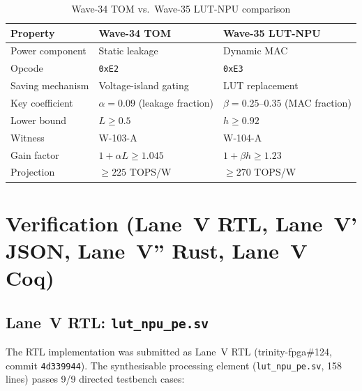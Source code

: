 \begin{table}[ht]
\centering
\caption{Wave-34 TOM vs.\ Wave-35 LUT-NPU comparison}
\label{tab:wave34_vs_wave35}
\begin{tabular}{lll}
\hline
Property & Wave-34 TOM & Wave-35 LUT-NPU \\
\hline
Power component & Static leakage & Dynamic MAC \\
Opcode & \texttt{0xE2} & \texttt{0xE3} \\
Saving mechanism & Voltage-island gating & LUT replacement \\
Key coefficient & $\alpha = 0.09$ (leakage fraction) & $\beta = 0.25$--$0.35$ (MAC fraction) \\
Lower bound & $L \geq 0.5$ & $h \geq 0.92$ \\
Witness & W-103-A & W-104-A \\
Gain factor & $1 + \alpha L \geq 1.045$ & $1 + \beta h \geq 1.23$ \\
Projection & $\geq 225$ TOPS/W & $\geq 270$ TOPS/W \\
\hline
\end{tabular}
\end{table}

\section{Verification (Lane~V RTL, Lane~V' JSON, Lane~V'' Rust, Lane~V Coq)}
\label{sec:verification}

\subsection{Lane~V RTL: \texttt{lut\_npu\_pe.sv}}

The RTL implementation was submitted as Lane~V RTL (trinity-fpga\#124,
commit \texttt{4d339944}).  The synthesisable processing element
(\texttt{lut\_npu\_pe.sv}, 158 lines) passes 9/9 directed testbench cases:

